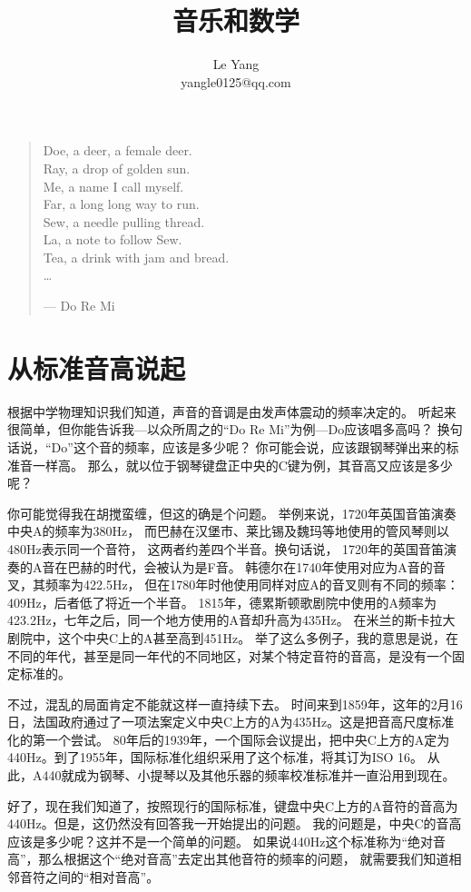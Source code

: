 \documentclass[hyperref, UTF8]{ctexart}
\begin{document}
\title{音乐和数学}
\author{
Le Yang\\
yangle0125@qq.com
}
\date{}
\maketitle


\begin{quote}
\begin{flushright}
Doe, a deer, a female deer.\\
Ray, a drop of golden sun.\\
Me, a name I call myself.\\
Far, a long long way to run.\\
Sew, a needle pulling thread.\\
La, a note to follow Sew.\\
Tea, a drink with jam and bread.\\
\dots

--- Do Re Mi
\end{flushright}
\end{quote}

\section{从标准音高说起}
根据中学物理知识我们知道，声音的音调是由发声体震动的频率决定的。
听起来很简单，但你能告诉我---以众所周之的“Do Re Mi”为例---Do应该唱多高吗？
换句话说，“Do”这个音的频率，应该是多少呢？
你可能会说，应该跟钢琴弹出来的标准音一样高。
那么，就以位于钢琴键盘正中央的C键为例，其音高又应该是多少呢？

你可能觉得我在胡搅蛮缠，但这的确是个问题。
举例来说，1720年英国音笛演奏中央A的频率为380Hz，
而巴赫在汉堡市、莱比锡及魏玛等地使用的管风琴则以480Hz表示同一个音符，
这两者约差四个半音。换句话说，
1720年的英国音笛演奏的A音在巴赫的时代，会被认为是F音。
韩德尔在1740年使用对应为A音的音叉，其频率为422.5Hz，
但在1780年时他使用同样对应A的音叉则有不同的频率：409Hz，后者低了将近一个半音。
1815年，德累斯顿歌剧院中使用的A频率为423.2Hz，七年之后，同一个地方使用的A音却升高为435Hz。
在米兰的斯卡拉大剧院中，这个中央C上的A甚至高到451Hz。
举了这么多例子，我的意思是说，在不同的年代，甚至是同一年代的不同地区，对某个特定音符的音高，是没有一个固定标准的。

不过，混乱的局面肯定不能就这样一直持续下去。
时间来到1859年，这年的2月16日，法国政府通过了一项法案定义中央C上方的A为435Hz。这是把音高尺度标准化的第一个尝试。
80年后的1939年，一个国际会议提出，把中央C上方的A定为440Hz。到了1955年，国际标准化组织采用了这个标准，将其订为ISO 16。
从此，A440就成为钢琴、小提琴以及其他乐器的频率校准标准并一直沿用到现在。

好了，现在我们知道了，按照现行的国际标准，键盘中央C上方的A音符的音高为440Hz。但是，这仍然没有回答我一开始提出的问题。
我的问题是，中央C的音高应该是多少呢？这并不是一个简单的问题。
如果说440Hz这个标准称为“绝对音高”，那么根据这个“绝对音高”去定出其他音符的频率的问题，
就需要我们知道相邻音符之间的“相对音高”。
\end{document}
